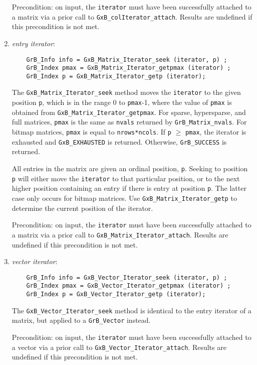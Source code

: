\documentclass[12pt]{article}
\begin{document}
\begin{enumerate}
        Precondition: on input, the \verb'iterator' must have been successfully
        attached to a matrix via a prior call to \verb'GxB_colIterator_attach'.
        Results are undefined if this precondition is not met.

    \item {\em entry iterator}:
    {\footnotesize
    \begin{verbatim}
    GrB_Info info = GxB_Matrix_Iterator_seek (iterator, p) ;
    GrB_Index pmax = GxB_Matrix_Iterator_getpmax (iterator) ;
    GrB_Index p = GxB_Matrix_Iterator_getp (iterator); \end{verbatim}}

        The \verb'GxB_Matrix_Iterator_seek' method moves the \verb'iterator' to
        the given position \verb'p', which is in the range 0 to \verb'pmax'-1,
        where the value of \verb'pmax' is obtained from
        \verb'GxB_Matrix_Iterator_getpmax'.
        For sparse, hypersparse, and full matrices, \verb'pmax' is the same as
        \verb'nvals' returned by \verb'GrB_Matrix_nvals'.  For bitmap matrices,
        \verb'pmax' is equal to \verb'nrows*ncols'.  If \verb'p' $\ge$
        \verb'pmax', the iterator is exhausted and \verb'GxB_EXHAUSTED' is
        returned.  Otherwise, \verb'GrB_SUCCESS' is returned.

        All entries in the matrix are given an ordinal position, \verb'p'.
        Seeking to position \verb'p' will either move the \verb'iterator' to
        that particular position, or to the next higher position containing an
        entry if there is entry at position \verb'p'.  The latter case only
        occurs for bitmap matrices.
        Use \verb'GxB_Matrix_Iterator_getp' to determine the current
        position of the iterator.

        Precondition: on input, the \verb'iterator' must have been successfully
        attached to a matrix via a prior call to
        \verb'GxB_Matrix_Iterator_attach'.  Results are undefined if this
        precondition is not met.

    \item {\em vector iterator}:
    {\footnotesize
    \begin{verbatim}
    GrB_Info info = GxB_Vector_Iterator_seek (iterator, p) ;
    GrB_Index pmax = GxB_Vector_Iterator_getpmax (iterator) ;
    GrB_Index p = GxB_Vector_Iterator_getp (iterator); \end{verbatim}}

        The \verb'GxB_Vector_Iterator_seek' method is identical to the
        entry iterator of a matrix, but applied to a \verb'GrB_Vector' instead.

        Precondition: on input, the \verb'iterator' must have been successfully
        attached to a vector via a prior call to
        \verb'GxB_Vector_Iterator_attach'.  Results are undefined if this
        precondition is not met.

    \end{enumerate}
\end{document}

